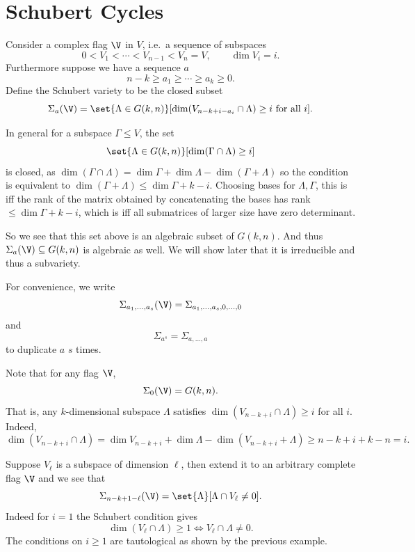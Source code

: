 \section{Schubert Cycles}

\bdefn

    Consider a complex flag $\V$ in $V$, i.e.\ a sequence of subspaces
    $$ 0 < V_1 < \cdots < V_{n-1} < V_n = V,\qquad \dim V_i = i . $$
    Furthermore suppose we have a sequence $a$
    $$ n-k \geq a_1 \geq \cdots \geq a_k \geq 0 . $$
    Define the {\emphcolor Schubert variety} to be the closed subset
    $$ \Sigma_a(\V) = \set{\Lambda\in G(k,n)}[\dim(V_{n-k+i-a_i}\cap\Lambda)\geq i\hbox{ for all $i$}] . $$

\edefn

\bremark

    In general for a subspace $\Gamma\leq V$, the set
    $$ \set{\Lambda\in G(k,n)}[\dim(\Gamma\cap\Lambda)\geq i] $$
    is closed, as $\dim(\Gamma\cap\Lambda)=\dim\Gamma+\dim\Lambda-\dim(\Gamma+\Lambda)$ so the condition
    is equivalent to $\dim(\Gamma+\Lambda)\leq\dim\Gamma+k-i$.
    Choosing bases for $\Lambda,\Gamma$, this is iff the rank of the matrix obtained by concatenating the
    bases has rank $\leq\dim\Gamma+k-i$, which is iff all submatrices of larger size have zero determinant.

    So we see that this set above is an algebraic subset of $G(k,n)$.
    And thus $\Sigma_a(\V)\subseteq G(k,n)$ is algebraic as well.
    We will show later that it is irreducible and thus a subvariety.

\eremark

For convenience, we write
$$ \Sigma_{a_1,\dots,a_s}(\V) = \Sigma_{a_1,\dots,a_s,0,\dots,0} $$
and
$$ \Sigma_{a^s} = \Sigma_{a,\dots,a} $$
to duplicate $a$ $s$ times.

\bexam

    Note that for any flag $\V$,
    $$ \Sigma_0(\V) = G(k,n) . $$
    That is, any $k$-dimensional subspace $\Lambda$ satisfies $\dim(V_{n-k+i}\cap\Lambda)\geq i$ for all $i$.
    Indeed,
    $$ \dim(V_{n-k+i}\cap\Lambda) = \dim V_{n-k+i} + \dim\Lambda - \dim(V_{n-k+i}+\Lambda) \geq
    n - k + i + k - n = i . $$

\eexam

\bexam

    Suppose $V_\ell$ is a subspace of dimension $\ell$, then extend it to an arbitrary complete flag $\V$
    and we see that
    $$ \Sigma_{n-k+1-\ell}(\V) = \set{\Lambda}[\Lambda\cap V_\ell\neq0] . $$
    Indeed for $i=1$ the Schubert condition gives
    $$ \dim(V_\ell\cap\Lambda) \geq 1 \iff V_\ell\cap\Lambda\neq 0 . $$
    The conditions on $i\geq1$ are tautological as shown by the previous example.

